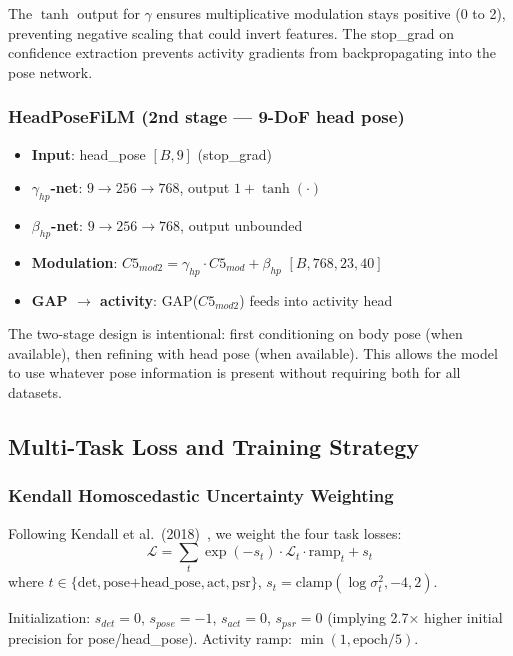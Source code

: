 \documentclass[11pt,a4paper]{article}
\begin{document}
The $\tanh$ output for $\gamma$ ensures multiplicative modulation stays positive (0 to 2), preventing negative scaling that could invert features. The stop\_grad on confidence extraction prevents activity gradients from backpropagating into the pose network.

\subsubsection{HeadPoseFiLM (2nd stage --- 9-DoF head pose)}
\begin{itemize}
\item \textbf{Input}: head\_pose $[B, 9]$ (stop\_grad)
\item \textbf{$\gamma_{hp}$-net}: $9 \rightarrow 256 \rightarrow 768$, output $1 + \tanh(\cdot)$
\item \textbf{$\beta_{hp}$-net}: $9 \rightarrow 256 \rightarrow 768$, output unbounded
\item \textbf{Modulation}: $C5_{mod2} = \gamma_{hp} \cdot C5_{mod} + \beta_{hp}$ $[B, 768, 23, 40]$
\item \textbf{GAP $\rightarrow$ activity}: GAP($C5_{mod2}$) feeds into activity head
\end{itemize}

The two-stage design is intentional: first conditioning on body pose (when available), then refining with head pose (when available). This allows the model to use whatever pose information is present without requiring both for all datasets.

\subsection{Multi-Task Loss and Training Strategy}

\subsubsection{Kendall Homoscedastic Uncertainty Weighting}
Following Kendall et al.~(2018)~\cite{kendall2018multi}, we weight the four task losses:
\begin{equation}
\mathcal{L} = \sum_{t} \exp(-s_t) \cdot \mathcal{L}_t \cdot \text{ramp}_t + s_t
\end{equation}
where $t \in \{\text{det}, \text{pose+head\_pose}, \text{act}, \text{psr}\}$, $s_t = \text{clamp}(\log \sigma^2_t, -4, 2)$.

Initialization: $s_{det}=0$, $s_{pose}=-1$, $s_{act}=0$, $s_{psr}=0$ (implying 2.7× higher initial precision for pose/head\_pose). Activity ramp: $\min(1, \text{epoch}/5)$.
\end{document}

